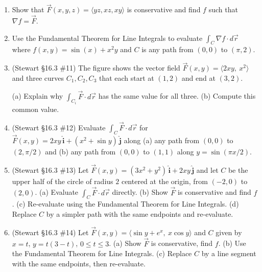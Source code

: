 \documentclass[12pt]{article}
\newcommand{\ihat}{\hat{\textbf{i}}}
\newcommand{\jhat}{\hat{\textbf{j}}}
\begin{document}
\begin{enumerate}
\begin{enumerate}
        \item Show that $\vec{F}(x,y,z) = \langle yz, xz, xy \rangle$ is conservative and find $f$ such that $\nabla f = \vec{F}$.
        \item Use the Fundamental Theorem for Line Integrals to evaluate $\int_{C} \nabla f \cdot d\vec{r}$ where $f(x,y) = \sin(x) + x^2y$ and $C$ is any path from $(0,0)$ to $(\pi, 2)$.
        \item (Stewart \S16.3 \#11) The figure shows the vector field $\vec F(x,y) = \langle 2xy,\ x^2\rangle$ and three curves $C_1, C_2, C_3$ that each start at $(1,2)$ and end at $(3,2)$.
        \begin{center}
        \end{center}
        (a) Explain why $\int_{C_i}\vec F\cdot d\vec r$ has the same value for all three. (b) Compute this common value.
        \item (Stewart \S16.3 \#12) Evaluate $\int_C \vec F\cdot d\vec r$ for $\vec F(x,y) = 2xy\,\ihat + (x^2 + \sin y)\,\jhat$ along (a) any path from $(0,0)$ to $(2, \pi/2)$ and (b) any path from $(0,0)$ to $(1,1)$ along $y = \sin(\pi x/2)$.
        \item (Stewart \S16.3 \#13) Let $\vec F(x,y) = (3x^2 + y^2)\,\ihat + 2xy\,\jhat$ and let $C$ be the upper half of the circle of radius $2$ centered at the origin, from $(-2,0)$ to $(2,0)$.
        (a) Evaluate $\int_C \vec F\cdot d\vec r$ directly. (b) Show $\vec F$ is conservative and find $f$. (c) Re-evaluate using the Fundamental Theorem for Line Integrals. (d) Replace $C$ by a simpler path with the same endpoints and re-evaluate.
        \item (Stewart \S16.3 \#14) Let $\vec F(x,y) = \langle \sin y + e^x,\ x\cos y\rangle$ and $C$ given by $x=t$, $y=t(3-t)$, $0\leq t\leq 3$.
        (a) Show $\vec F$ is conservative, find $f$. (b) Use the Fundamental Theorem for Line Integrals. (c) Replace $C$ by a line segment with the same endpoints, then re-evaluate.

\end{enumerate}
\end{enumerate}
\end{document}
